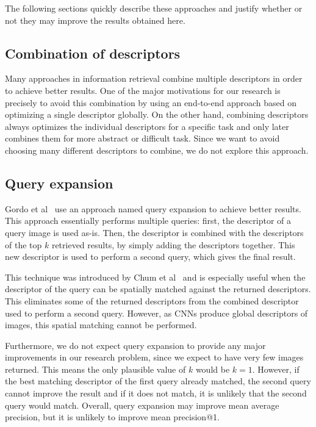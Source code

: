 The following sections quickly describe these approaches and
justify whether or not they may improve the results obtained
here.

\subsection{Combination of descriptors}
Many approaches in information retrieval combine multiple
descriptors in order to achieve better results. One of the
major motivations for our research is precisely to avoid
this combination by using an end-to-end approach based
on optimizing a single descriptor globally. On the other hand,
combining descriptors always optimizes the individual descriptors
for a specific task and only later combines them for more
abstract or difficult task. Since we want to avoid choosing
many different descriptors to combine, we do not explore
this approach.

\subsection{Query expansion}
Gordo et al~\cite{gordo_end--end_2016} use an approach
named query expansion to achieve better results. This
approach essentially performs multiple queries: first, the
descriptor of a query image is used as-is. Then, the descriptor
is combined with the descriptors of the top $k$ retrieved
results, by simply adding the descriptors together. This new
descriptor is used to perform a second query, which gives
the final result.

This technique was introduced by
Chum et al~\cite{chum_total_2007} and is especially useful
when the descriptor of the query can be spatially matched
against the returned descriptors. This eliminates some of the
returned descriptors from the combined descriptor used
to perform a second query. However, as CNNs produce
global descriptors of images, this spatial matching cannot
be performed.

Furthermore, we do not expect query expansion to provide
any major improvements in our research problem, since
we expect to have very few images returned. This means
the only plausible value of $k$ would be $k=1$. However,
if the best matching descriptor of the first query already
matched, the second query cannot improve the result
and if it does not match, it is unlikely that the second
query would match. Overall, query expansion may
improve mean average precision, but it is unlikely to
improve mean precision@1.

